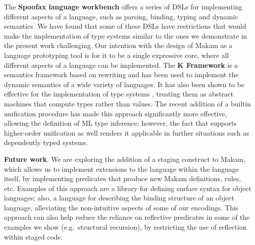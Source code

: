 The \textbf{Spoofax language workbench} \citep{spoofax-main-reference}
offers a series of DSLs for implementing different aspects of a
language, such as parsing, binding, typing and dynamic semantics. We
have found that some of these DSLs have restrictions that would make the
implementation of type systems similar to the ones we demonstrate in the
present work challenging. Our intention with the design of Makam as a
language prototyping tool is for it to be a single expressive core,
where all different aspects of a language can be implemented. The
\textbf{K Framework} \citep{k-framework-main-reference} is a semantics
framework based on rewriting and has been used to implement the dynamic
semantics of a wide variety of languages. It has also been shown to be
effective for the implementation of type systems
\citep{k-framework-type-systems}, treating them as abstract machines
that compute types rather than values. The recent addition of a builtin
unification procedure has made this approach significantly more
effective, allowing the definition of ML type inference; however, the
fact that \lamprolog supports higher-order unification as well renders
it applicable in further situations such as dependently typed systems.

\textbf{Future work}. We are exploring the addition of a staging
construct to Makam, which allows us to implement extensions to the
language within the language itself, by implementing predicates that
produce new Makam definitions, rules, etc. Examples of this approach are
a library for defining surface syntax for object languages; also, a
language for describing the binding structure of an object language,
alleviating the non-intuitive aspects of some of our encodings. This
approach can also help reduce the reliance on reflective predicates in
some of the examples we show (e.g.~structural recursion), by restricting
the use of reflection within staged code.
